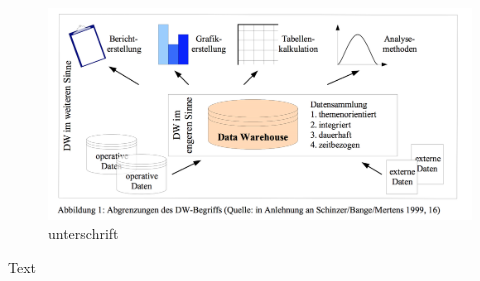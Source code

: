 \begin{figure}[H]
    \centering
    \includegraphics[width=.8\textwidth]{files/DWOverview}
    \caption{unterschrift}
    \label{pic:DWOverview}
\end{figure}




Text
